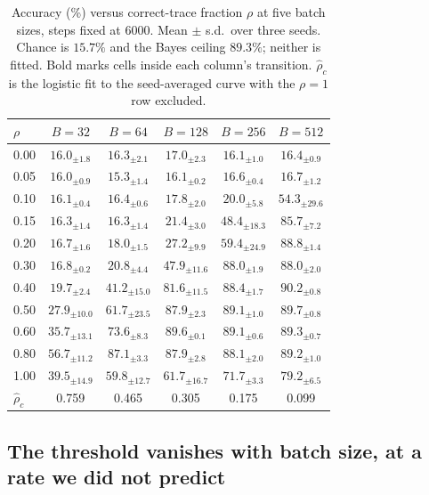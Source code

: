 \documentclass{article}
\theoremstyle{plain}
\theoremstyle{definition}
\theoremstyle{remark}
\newcommand{\1}{\mathbf{1}}
\begin{document}
\begin{table}[t]
\caption{Accuracy (\%) versus correct-trace fraction $\rho$ at five batch sizes,
steps fixed at $6000$. Mean $\pm$ s.d.\ over three seeds. Chance is $15.7\%$ and
the Bayes ceiling $89.3\%$; neither is fitted. Bold marks cells inside each
column's transition. $\hat\rho_c$ is the logistic fit to the seed-averaged curve
with the $\rho = 1$ row excluded.}
\label{tab:batchsweep}
\centering
\small
\begin{tabular}{lccccc}
\toprule
$\rho$ & $B=32$ & $B=64$ & $B=128$ & $B=256$ & $B=512$ \\
\midrule
0.00 & $16.0_{\pm1.8}$ & $16.3_{\pm2.1}$ & $17.0_{\pm2.3}$ & $16.1_{\pm1.0}$ & $16.4_{\pm0.9}$ \\
0.05 & $16.0_{\pm0.9}$ & $15.3_{\pm1.4}$ & $16.1_{\pm0.2}$ & $16.6_{\pm0.4}$ & $16.7_{\pm1.2}$ \\
0.10 & $16.1_{\pm0.4}$ & $16.4_{\pm0.6}$ & $17.8_{\pm2.0}$ & $20.0_{\pm5.8}$ & $\mathbf{54.3}_{\pm29.6}$ \\
0.15 & $16.3_{\pm1.4}$ & $16.3_{\pm1.4}$ & $21.4_{\pm3.0}$ & $\mathbf{48.4}_{\pm18.3}$ & $\mathbf{85.7}_{\pm7.2}$ \\
0.20 & $16.7_{\pm1.6}$ & $18.0_{\pm1.5}$ & $\mathbf{27.2}_{\pm9.9}$ & $\mathbf{59.4}_{\pm24.9}$ & $88.8_{\pm1.4}$ \\
0.30 & $16.8_{\pm0.2}$ & $20.8_{\pm4.4}$ & $\mathbf{47.9}_{\pm11.6}$ & $88.0_{\pm1.9}$ & $88.0_{\pm2.0}$ \\
0.40 & $19.7_{\pm2.4}$ & $\mathbf{41.2}_{\pm15.0}$ & $\mathbf{81.6}_{\pm11.5}$ & $88.4_{\pm1.7}$ & $90.2_{\pm0.8}$ \\
0.50 & $\mathbf{27.9}_{\pm10.0}$ & $\mathbf{61.7}_{\pm23.5}$ & $87.9_{\pm2.3}$ & $89.1_{\pm1.0}$ & $89.7_{\pm0.8}$ \\
0.60 & $\mathbf{35.7}_{\pm13.1}$ & $\mathbf{73.6}_{\pm8.3}$ & $89.6_{\pm0.1}$ & $89.1_{\pm0.6}$ & $89.3_{\pm0.7}$ \\
0.80 & $\mathbf{56.7}_{\pm11.2}$ & $87.1_{\pm3.3}$ & $87.9_{\pm2.8}$ & $88.1_{\pm2.0}$ & $89.2_{\pm1.0}$ \\
1.00 & $39.5_{\pm14.9}$ & $59.8_{\pm12.7}$ & $61.7_{\pm16.7}$ & $71.7_{\pm3.3}$ & $79.2_{\pm6.5}$ \\
\midrule
$\hat\rho_c$ & 0.759 & 0.465 & 0.305 & 0.175 & 0.099 \\
\bottomrule
\end{tabular}
\end{table}

\subsection{The threshold vanishes with batch size, at a rate we did not predict}
\label{sec:exponent}
\end{document}
